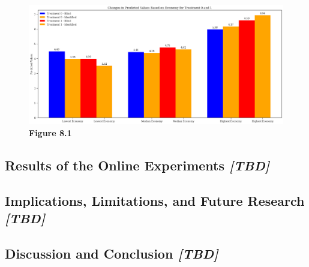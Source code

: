 \documentclass[
]{article}
\begin{document}
\begin{figure}
\centering
\includegraphics{pred_low.png}
\caption{\textbf{Figure 8.1}}
\end{figure}

\hypertarget{results-of-the-online-experiments-tbd}{%
\subsection{\texorpdfstring{Results of the Online Experiments
\emph{{[}TBD{]}}}{Results of the Online Experiments {[}TBD{]}}}\label{results-of-the-online-experiments-tbd}}

\hypertarget{implications-limitations-and-future-research-tbd}{%
\subsection{\texorpdfstring{Implications, Limitations, and Future
Research
\emph{{[}TBD{]}}}{Implications, Limitations, and Future Research {[}TBD{]}}}\label{implications-limitations-and-future-research-tbd}}

\hypertarget{discussion-and-conclusion-tbd}{%
\subsection{\texorpdfstring{Discussion and Conclusion
\emph{{[}TBD{]}}}{Discussion and Conclusion {[}TBD{]}}}\label{discussion-and-conclusion-tbd}}
\end{document}
